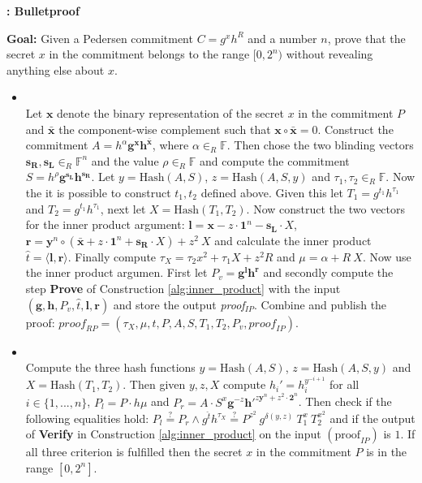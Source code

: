 \begin{algorithm}[]
\caption{\textbf{: Bulletproof}}
\textbf{Goal:}  Given a Pedersen commitment $C=g^x h^R$ and a number $n$, prove that the secret $x$ in the commitment belongs to the range  $[0,2^n)$ without revealing anything else about $x$.
\vspace{2pt}
\hline
\vspace{2pt}
\begin{itemize}
\item{}\\
Let $\bm{x}$ denote the binary representation of the secret $x$ in the commitment $P$ and $\bar{\bm{x}}$ the component-wise complement such  that $\bm{x}\circ \bar{\bm{x}} = 0$. Construct the commitment $A= h^\alpha \bm{g}^{\bm{x}} \bm{h}^\bar{\bm{x}}$, where $\alpha\in_R\mathds{F}$. Then chose the two blinding vectors $\bm{s_R},\bm{s_L}\in_R\mathds{F}^n$ and the value $\rho\in_R\mathds{F}$ and compute the commitment $S=h^\rho \bm{g}^{\bm{s_L}}\bm{h}^\bm{s_R}$. Let $y=\text{Hash}(A,S)$, $z=\text{Hash}(A,S,y)$ and $\tau_1,\tau_2\in_R\mathds{F}$. Now the it is possible to construct $t_1,t_2$ defined above. Given this let $T_1=g^{t_1}h^{\tau_1}$ and $T_2=g^{t_1}h^{\tau_1}$, next let $X=\text{Hash}(T_1,T_2)$. Now construct the two vectors for the inner product argument: $\bm{l} = \bm{x}-z\cdot \bm{1}^n-\bm{s_L}\cdot X$, $\bm{r}= \bm{y}^n\circ(\bar{\bm{x}}+ z\cdot \bm{1}^n+\bm{s_R}\cdot X ) + z^2\ X $ and calculate the inner product $\hat{t} = \langle \bm{l},\bm{r}\rangle$. Finally compute $\tau_X = \tau_2 x^2 + \tau_1 X + z^2 R$ and $\mu = \alpha+ R\:X$.  Now use the inner product argumen.  First let $P_v = \bm{g}^{\bm{l}}\bm{h}^\bm{r}$ and  secondly compute the step \textbf{Prove}  of Construction \ref{alg:inner_product}  with the input $(\bm{g},\bm{h},P_v,\hat{t},\bm{l},\bm{r})$ and store the output \textit{proof$_{IP}$}. Combine and publish  the proof: $\textit{proof}_{RP} = (\tau_X, \mu , \hat{t}, P, A, S, T_1, T_2 , P_v ,\textit{proof}_{IP}) $.

\item{}\\
Compute the three hash functions $y= \text{Hash}(A,S)$, $z= \text{Hash}(A,S,y)$ and $X= \text{Hash}(T_1,T_2)$. Then given  $y,z,X$ compute $h_i' = h_i ^{y^{-i+1}}$ for all $i\in\{1,...,n\}$, $P_l = P\cdot h\mu$ and $P_r = A\cdot S ^x \bm{g}^ {-z}\bm{h'}^{z\bm{y}^n+z^2\cdot \bm{2}^n}$. Then check if the following equalities hold: $P_l\overset{?}{=} P_r \wedge g^{\hat{t}}h^{\tau_X} \overset{?}{=}  P ^{z^2}\:g^{\delta(y,z)}\:T_1^x\:T_2^{x^2}$ and if the output of \textbf{Verify} in Construction \ref{alg:inner_product} on the input $(\text{proof}_{IP})$ is $1$. If all three criterion is fulfilled then the secret  $x$ in the commitment $P$ is in the range $[0,2^n]$.
\end{itemize}
\label{alg:bullet}
\end{algorithm}


